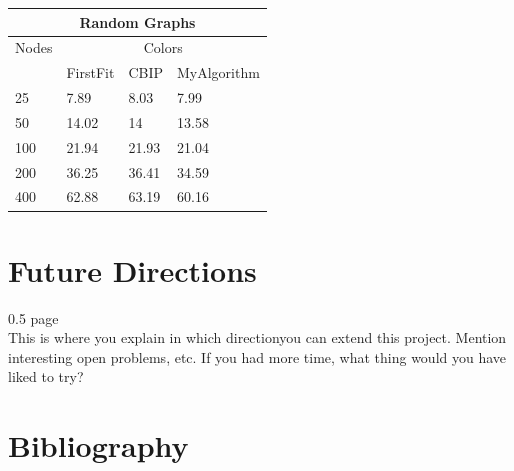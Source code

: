 \documentclass{article}
\begin{document}
\begin{center}
 \begin{tabular}{||p{2cm} | p{2cm} | p{2cm} | p{2cm} ||} 
\hline
\multicolumn{4}{|c|}{Random Graphs} \\
\hline
\hline
 Nodes & \multicolumn{3}{|c|}{Colors} \\
\hline
 & FirstFit & CBIP & MyAlgorithm \\ [0.5ex] 
 \hline\hline
 25 & 7.89 & 8.03 & 7.99 \\ 
 \hline
 50 & 14.02 & 14 & 13.58\\
 \hline
 100 & 21.94 & 21.93 & 21.04 \\
 \hline
 200 & 36.25 & 36.41 & 34.59 \\
 \hline
 400 & 62.88 & 63.19 & 60.16\\ [1ex] 
 \hline
\end{tabular}
\end{center}


\newpage

\section{Future Directions}
0.5 page\\
This is where you explain in which directionyou can extend this project. Mention interesting open problems, etc. If you had more time,
what thing would you have liked to try?
\newpage

\section{Bibliography}




\newpage
\end{document}
